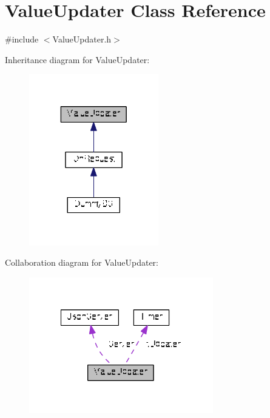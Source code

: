 \hypertarget{class_value_updater}{\section{Value\+Updater Class Reference}
\label{class_value_updater}
}


{\ttfamily \#include $<$Value\+Updater.\+h$>$}



Inheritance diagram for Value\+Updater\+:\nopagebreak
\begin{figure}[H]
\begin{center}
\leavevmode
\includegraphics[width=160pt]{class_value_updater__inherit__graph}
\end{center}
\end{figure}


Collaboration diagram for Value\+Updater\+:\nopagebreak
\begin{figure}[H]
\begin{center}
\leavevmode
\includegraphics[width=227pt]{class_value_updater__coll__graph}
\end{center}
\end{figure}
